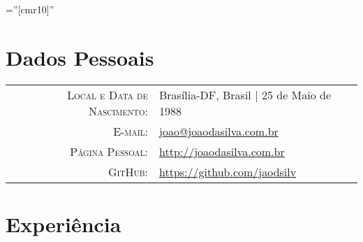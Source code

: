 \documentclass[a4paper,10pt]{article} %
\begin{document}
\pagestyle{empty} %

\font\fb=''[cmr10]'' %


\par{\bigskip\par} %

\section{Dados Pessoais}

\begin{tabular}{rl}
\textsc{Local e Data de Nascimento:} & Brasília-DF, Brasil | 25 de Maio de 1988 \\
\textsc{E-mail:} & \href{mailto:joao@joaodasilva.com.br}{joao@joaodasilva.com.br}\\
\textsc{Página Pessoal:} & \href{http://joaodasilva.com.br}{http://joaodasilva.com.br}\\
\textsc{GitHub:} & \href{https://github.com/jaodsilv}{https://github.com/jaodsilv}\\
\end{tabular}



\section{Experiência}
\end{document}
